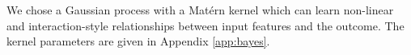 \documentclass[12pt, a4paper]{article}
\begin{document}
%
%
%
We chose a Gaussian process with a Mat\'{e}rn kernel which can learn non-linear and 
interaction-style relationships between input features and the outcome. The kernel parameters are given in Appendix \ref{app:bayes}. 

\end{document}
